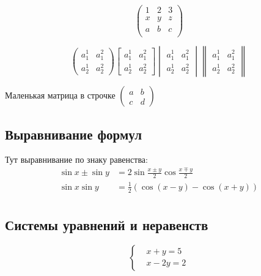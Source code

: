 \documentclass [a4paper,oneside,final,14pt]{extarticle}
\begin{document}

\[ \left( \begin{matrix} 1 & 2 & 3 \\ x & y & z \\ a & b & c \\ \end{matrix} \right) \]

\[
\begin{pmatrix} a_1^1 & a_1^2 \\ a_2^1 & a_2^2 \end{pmatrix}
\begin{bmatrix} a_1^1 & a_1^2 \\ a_2^1 & a_2^2 \end{bmatrix}
\begin{vmatrix} a_1^1 & a_1^2 \\ a_2^1 & a_2^2 \end{vmatrix}
\begin{Vmatrix} a_1^1 & a_1^2 \\ a_2^1 & a_2^2 \end{Vmatrix}
\]


Маленькая матрица в строчке \(
\left( \begin{smallmatrix}
	a & b \\ c & d
\end{smallmatrix}\right) 
\)


\subsection{Выравнивание формул}
Тут выравнивание по знаку равенства:
\[\begin{aligned}
\sin x\pm\sin y &= 2\sin\frac{x\pm y}{2}\cos\frac{x\mp y}{2} \\
\sin x\sin y &= \frac{1}{2}(\cos(x-y)-\cos(x+y)) \\
\end{aligned}\]

\subsection{Системы уравнений и неравенств}

\[ \left\{\begin{aligned}
	& x+y=5 \\
	& x-2y=2
\end{aligned}\right. \]
\end{document}
